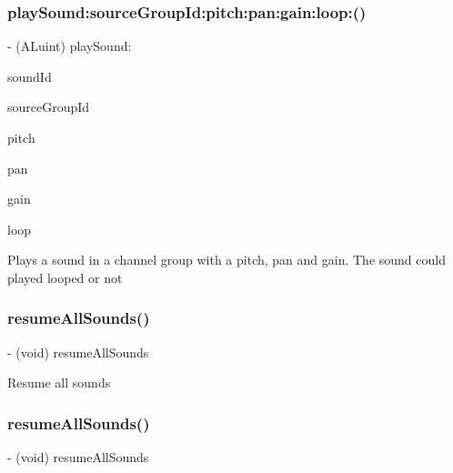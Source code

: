 \subsubsection{\texorpdfstring{play\+Sound\+:source\+Group\+Id\+:pitch\+:pan\+:gain\+:loop\+:()}{playSound:sourceGroupId:pitch:pan:gain:loop:()}\hspace{0.1cm}{\footnotesize\ttfamily [4/4]}}
{\footnotesize\ttfamily -\/ (A\+Luint) play\+Sound\+: \begin{DoxyParamCaption}\item[{(int)}]{sound\+Id }\item[{sourceGroupId:(int)}]{source\+Group\+Id }\item[{pitch:(float)}]{pitch }\item[{pan:(float)}]{pan }\item[{gain:(float)}]{gain }\item[{loop:(B\+O\+OL)}]{loop }\end{DoxyParamCaption}}

Plays a sound in a channel group with a pitch, pan and gain. The sound could played looped or not \mbox{\label{interfaceCDSoundEngine_a307f8d30e7fb5c7f29edbaea19709741}} 
\subsubsection{\texorpdfstring{resume\+All\+Sounds()}{resumeAllSounds()}\hspace{0.1cm}{\footnotesize\ttfamily [1/4]}}
{\footnotesize\ttfamily -\/ (void) resume\+All\+Sounds \begin{DoxyParamCaption}{ }\end{DoxyParamCaption}}

Resume all sounds \mbox{\label{interfaceCDSoundEngine_a307f8d30e7fb5c7f29edbaea19709741}} 
\subsubsection{\texorpdfstring{resume\+All\+Sounds()}{resumeAllSounds()}\hspace{0.1cm}{\footnotesize\ttfamily [2/4]}}
{\footnotesize\ttfamily -\/ (void) resume\+All\+Sounds \begin{DoxyParamCaption}{ }\end{DoxyParamCaption}}


